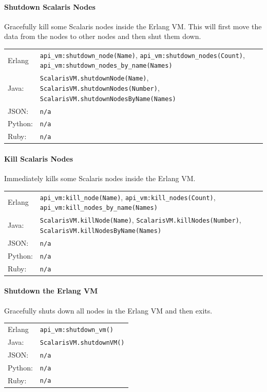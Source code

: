 \documentclass[a4paper]{scrreprt}
\newcommand{\code}[1]{\lstinline[basicstyle=\ttfamily]!#1!}
\begin{document}
\paragraph{Shutdown Scalaris Nodes}
Gracefully kill some Scalaris nodes inside the Erlang VM. This will first move
the data from the nodes to other nodes and then shut them down.

\begin{tabular}{lp{14cm}}
Erlang  & \code{api_vm:shutdown_node(Name)},\newline
          \code{api_vm:shutdown_nodes(Count)}, \code{api_vm:shutdown_nodes_by_name(Names)}\\
Java:   & \code{ScalarisVM.shutdownNode(Name)},\newline
          \code{ScalarisVM.shutdownNodes(Number)}, \code{ScalarisVM.shutdownNodesByName(Names)}\\
JSON:   & \code{n/a}\\
Python: & \code{n/a}\\
Ruby:   & \code{n/a}
\end{tabular}

\paragraph{Kill Scalaris Nodes}
Immediately kills some Scalaris nodes inside the Erlang VM.

\begin{tabular}{lp{14cm}}
Erlang  & \code{api_vm:kill_node(Name)},\newline
          \code{api_vm:kill_nodes(Count)}, \code{api_vm:kill_nodes_by_name(Names)}\\
Java:   & \code{ScalarisVM.killNode(Name)},\newline
          \code{ScalarisVM.killNodes(Number)}, \code{ScalarisVM.killNodesByName(Names)}\\
JSON:   & \code{n/a}\\
Python: & \code{n/a}\\
Ruby:   & \code{n/a}
\end{tabular}

\paragraph{Shutdown the Erlang VM}
Gracefully shuts down all \scalaris{} nodes in the Erlang VM and then exits.

\begin{tabular}{lp{14cm}}
Erlang  & \code{api_vm:shutdown_vm()}\\
Java:   & \code{ScalarisVM.shutdownVM()}\\
JSON:   & \code{n/a}\\
Python: & \code{n/a}\\
Ruby:   & \code{n/a}
\end{tabular}
\end{document}
